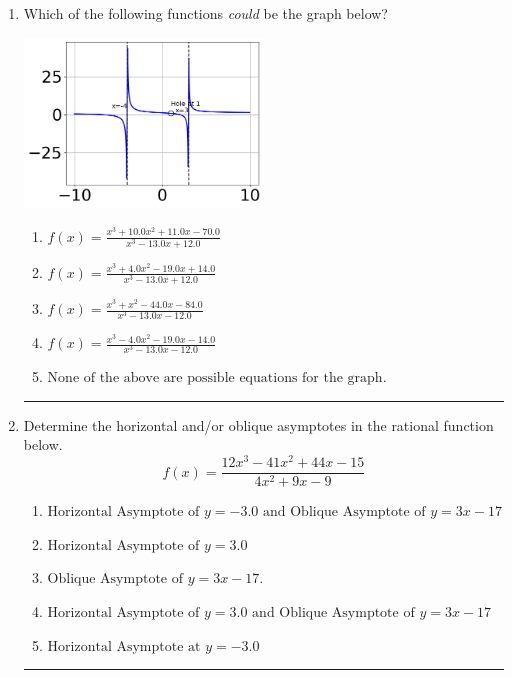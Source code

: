 \documentclass[14pt]{extbook}
\newcommand{\litem}[1]{\item#1\hspace*{-1cm}\rule{\textwidth}{0.4pt}}
\begin{document}
\begin{enumerate}
\litem{
Which of the following functions \textit{could} be the graph below?
\begin{center}
    \includegraphics[width=0.5\textwidth]{../Figures/identifyGraphOfRationalFunctionA.png}
\end{center}
\begin{enumerate}[label=\Alph*.]
\item \( f(x)=\frac{x^{3} +10.0 x^{2} +11.0 x -70.0}{x^{3} -13.0 x + 12.0} \)
\item \( f(x)=\frac{x^{3} +4.0 x^{2} -19.0 x + 14.0}{x^{3} -13.0 x + 12.0} \)
\item \( f(x)=\frac{x^{3} + x^{2} -44.0 x -84.0}{x^{3} -13.0 x -12.0} \)
\item \( f(x)=\frac{x^{3} -4.0 x^{2} -19.0 x -14.0}{x^{3} -13.0 x -12.0} \)
\item \( \text{None of the above are possible equations for the graph.} \)

\end{enumerate} }
\litem{
Determine the horizontal and/or oblique asymptotes in the rational function below.\[ f(x) = \frac{12x^{3} -41 x^{2} +44 x -15}{4x^{2} +9 x -9} \]\begin{enumerate}[label=\Alph*.]
\item \( \text{Horizontal Asymptote of } y = -3.0 \text{ and Oblique Asymptote of } y = 3x -17 \)
\item \( \text{Horizontal Asymptote of } y = 3.0  \)
\item \( \text{Oblique Asymptote of } y = 3x -17. \)
\item \( \text{Horizontal Asymptote of } y = 3.0 \text{ and Oblique Asymptote of } y = 3x -17 \)
\item \( \text{Horizontal Asymptote at } y = -3.0 \)


\end{enumerate}}
\end{enumerate}
\end{document}
